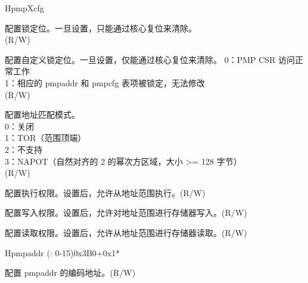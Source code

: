 \begin{register}{H}{pmpXcfg}{}
\label{regdesc:pmpXcfg}%
%
%
%
%
%
%
%
\regnewline%
\begin{regdesc}
\begin{reglist}
\label{fielddesc:pmpXcfgL}\item [L] 配置锁定位。一旦设置，只能通过核心复位来清除。\\
(R/W)
\label{fielddesc:pmpXcfgXL}\item [XL] 配置自定义锁定位。一旦设置，仅能通过核心复位来清除。
0：PMP CSR 访问正常工作 \\
1：相应的 pmpaddr 和 pmpcfg 表项被锁定，无法修改\\
(R/W)
\label{fielddesc:pmpXcfgA}\item [A] 配置地址匹配模式。 \\
0：关闭 \\
1：TOR（范围顶端）\\
2：不支持 \\
3：NAPOT（自然对齐的 2 的幂次方区域，大小 >= 128 字节）\\
(R/W)
\label{fielddesc:pmpXcfgX}\item [X] 配置执行权限。设置后，允许从地址范围执行。(R/W)
\label{fielddesc:pmpXcfgW}\item [W] 配置写入权限。设置后，允许对地址范围进行存储器写入。(R/W)
\label{fielddesc:pmpXcfgR}\item [R] 配置读取权限。设置后，允许从地址范围进行存储器读取。(R/W)
\end{reglist}
\end{regdesc}
\end{register}

\begin{register}{H}{pmpaddr (: 0-15)}{0x3B0+0x1*}\label{regdesc:pmpaddrN}
%
\regnewline%
\begin{regdesc}\begin{reglist}
\label{fielddesc:ADDR}\item [address] 配置 pmpaddr 的编码地址。(R/W)
\end{reglist}\end{regdesc}
\end{register}